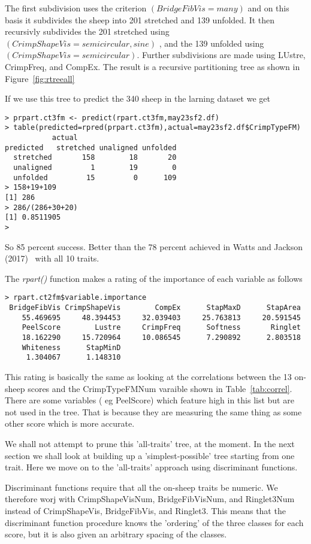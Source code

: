\documentclass[titlepage]{article}  %
\begin{document}
The first subdivision uses the criterion $(BridgeFibVis=many)$ and on this basis it subdivides the sheep into 201 stretched and 139 unfolded. It then recursivly subdivides the 201 stretched using $(CrimpShapeVis=semicircular,sine)$ , and the 139 unfolded using$(CrimpShapeVis=semicircular)$. Further subdivisions are made using LUstre, CrimpFreq, and CompEx. The result is a recursive partitioning tree as shown in Figure~\ref{fig:rtreeall}

If we use this tree to predict the 340 sheep in the larning dataset we get
\begin{verbatim}
> prpart.ct3fm <- predict(rpart.ct3fm,may23sf2.df)
> table(predicted=rpred(prpart.ct3fm),actual=may23sf2.df$CrimpTypeFM)
           actual
predicted   stretched unaligned unfolded
  stretched       158        18       20
  unaligned         1        19        0
  unfolded         15         0      109
> 158+19+109
[1] 286
> 286/(286+30+20)
[1] 0.8511905
> 
\end{verbatim}
So 85 percent success. Better than the 78 percent achieved in Watts and Jackson (2017)~\cite{watt:17} with all 10 traits.

The {\em rpart()} function makes a rating of the importance of each variable as follows
\begin{verbatim}
> rpart.ct2fm$variable.importance
 BridgeFibVis CrimpShapeVis        CompEx      StapMaxD      StapArea 
    55.469695     48.394453     32.039403     25.763813     20.591545 
    PeelScore        Lustre     CrimpFreq      Softness       Ringlet 
    18.162290     15.720964     10.086545      7.290892      2.803518 
    Whiteness      StapMinD 
     1.304067      1.148310 
\end{verbatim}
This rating is basically the same as looking at the correlations between the 13 on-sheep scores and the CrimpTypeFMNum varaible shown in Table~\ref{tab:correl}.
There are some variables ( eg PeelScore) which feature high in this list but are not used in the tree. That is because they are measuring the same thing as some other score which is more accurate.

We shall not attempt to prune this 'all-traits' tree, at the moment. In the next section we shall look at  building up a 'simplest-possible' tree starting from one trait. Here we move on to the 'all-traits' approach using discriminant functions.

Discriminant functions require that all the on-sheep traits be numeric. We therefore worj with CrimpShapeVisNum, BridgeFibVisNum, and Ringlet3Num instead of CrimpShapeVis, BridgeFibVis, and Ringlet3. This means that the discriminant function procedure knows the 'ordering' of the three classes for each score, but it is also given an arbitrary spacing of the classes.
\end{document}
